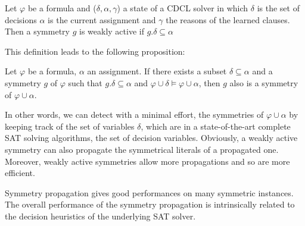 
\begin{definition}
 \label{def:weakly_active_symmetry}
 Let $\varphi$ be a formula and ($\delta, \alpha, \gamma$) a state of a CDCL solver in which $\delta$ is the set of decisions
 $\alpha$ is the current assignment and $\gamma$ the reasons of the learned clauses. Then a symmetry $g$ is weakly active 
 if $g.\delta \subseteq \alpha$
\end{definition}
This definition leads to the following proposition:
\begin{proposition}
 Let $\varphi$ be a formula, $\alpha $ an assignment. If
 there exists a subset $\delta \subseteq \alpha $ and a symmetry $g$ of $\varphi$ such that 
 $g.\delta \subseteq \alpha $ and $\varphi \cup \delta \models \varphi \cup \alpha$, then $g$ 
 also is a symmetry of $\varphi \cup \alpha $.
\end{proposition}


In other words, we can detect with a minimal effort, the symmetries of $\varphi
\cup \alpha$ by keeping track of the set of variables $\delta$, which are 
in a state-of-the-art complete SAT solving algorithms, the set of decision variables.
Obviously, a weakly active symmetry can also propagate the symmetrical literals of a propagated one.
Moreover, weakly active symmetries allow more propagations and so are more efficient.


Symmetry propagation gives good performances on many symmetric instances.
The overall performance of the symmetry propagation is intrinsically related to the decision heuristics of the underlying SAT solver.


